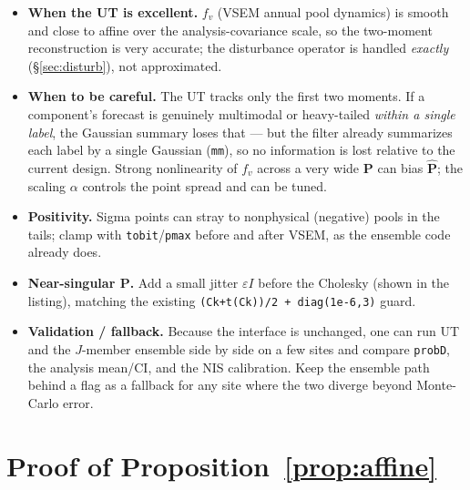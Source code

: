 \documentclass[11pt]{article}
\newcommand{\code}[1]{\texttt{#1}}
\newcommand{\bm}[1]{\boldsymbol{#1}}
\begin{document}
\begin{itemize}[nosep]
  \item \textbf{When the UT is excellent.} $f_v$ (VSEM annual pool dynamics) is smooth and
        close to affine over the analysis-covariance scale, so the two-moment
        reconstruction is very accurate; the disturbance operator is handled
        \emph{exactly} (\S\ref{sec:disturb}), not approximated.
  \item \textbf{When to be careful.} The UT tracks only the first two moments. If a
        component's forecast is genuinely multimodal or heavy-tailed \emph{within a single
        label}, the Gaussian summary loses that --- but the filter already summarizes each
        label by a single Gaussian (\code{mm}), so no information is lost relative to the
        current design. Strong nonlinearity of $f_v$ across a very wide $\bm P$ can bias
        $\hat{\bm P}$; the scaling $\alpha$ controls the point spread and can be tuned.
  \item \textbf{Positivity.} Sigma points can stray to nonphysical (negative) pools in the
        tails; clamp with \code{tobit}/\code{pmax} before and after VSEM, as the ensemble
        code already does.
  \item \textbf{Near-singular $\bm P$.} Add a small jitter $\varepsilon I$ before the
        Cholesky (shown in the listing), matching the existing
        \code{(Ck+t(Ck))/2 + diag(1e-6,3)} guard.
  \item \textbf{Validation / fallback.} Because the interface is unchanged, one can run
        UT and the $J$-member ensemble side by side on a few sites and compare
        \code{probD}, the analysis mean/CI, and the NIS calibration. Keep the ensemble
        path behind a flag as a fallback for any site where the two diverge beyond
        Monte-Carlo error.
\end{itemize}

\appendix
\section{Proof of Proposition~\ref{prop:affine}}
\label{app:affine}
\end{document}
